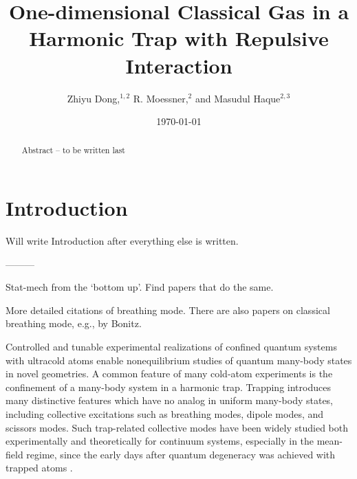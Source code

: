\documentclass[aps,preprintnumbers,onecolumn,amsmath,amssymb,floatfix,pra]{revtex4-1}
\begin{document}
\title{One-dimensional Classical Gas in a Harmonic Trap with Repulsive Interaction}

\author{
Zhiyu Dong,$^{1,2}$
R. Moessner,$^2$
and Masudul Haque$^{2,3}$}





\date{\today}
 
 
\begin{abstract}

Abstract --  to be written last
   
\end{abstract}

\maketitle


\section{Introduction}

Will write Introduction after everything else is written.  

---------


Stat-mech from the `bottom up'.  Find papers that do the same. 

More detailed citations of breathing mode.  There are also papers on classical breathing mode, e.g.,
by Bonitz.  

Controlled and tunable experimental realizations of confined quantum systems with ultracold atoms
enable nonequilibrium studies of quantum many-body states in novel geometries. A common feature of
many cold-atom experiments is the confinement of a many-body system in a harmonic trap. Trapping
introduces many distinctive features which have no analog in uniform many-body states, including
collective excitations such as breathing modes, dipole modes, and scissors modes. Such trap-related
collective modes have been widely studied both experimentally and theoretically for continuum
systems, especially in the mean-field regime, since the early days after quantum degeneracy was
achieved with trapped atoms \cite{Dalfovo1997}\cite{Jin1996}.
\end{document}
